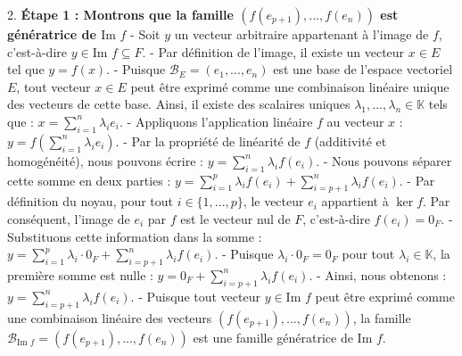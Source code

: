 \documentclass{report}
\begin{document}
2.  \textbf{Étape 1 : Montrons que la famille $(f(e_{p+1}), ..., f(e_n))$ est génératrice de $\text{Im } f$}
    -   Soit $y$ un vecteur arbitraire appartenant à l'image de $f$, c'est-à-dire $y \in \text{Im } f \subseteq F$.
    -   Par définition de l'image, il existe un vecteur $x \in E$ tel que $y = f(x)$.
    -   Puisque $\mathcal{B}_E = (e_1, ..., e_n)$ est une base de l'espace vectoriel $E$, tout vecteur $x \in E$ peut être exprimé comme une combinaison linéaire unique des vecteurs de cette base. Ainsi, il existe des scalaires uniques $\lambda_1, ..., \lambda_n \in \mathbb{K}$ tels que :
        $x = \sum_{i=1}^n \lambda_i e_i$.
    -   Appliquons l'application linéaire $f$ au vecteur $x$ :
        $y = f\left(\sum_{i=1}^n \lambda_i e_i\right)$.
    -   Par la propriété de linéarité de $f$ (additivité et homogénéité), nous pouvons écrire :
        $y = \sum_{i=1}^n \lambda_i f(e_i)$.
    -   Nous pouvons séparer cette somme en deux parties :
        $y = \sum_{i=1}^p \lambda_i f(e_i) + \sum_{i=p+1}^n \lambda_i f(e_i)$.
    -   Par définition du noyau, pour tout $i \in \{1, ..., p\}$, le vecteur $e_i$ appartient à $\ker f$. Par conséquent, l'image de $e_i$ par $f$ est le vecteur nul de $F$, c'est-à-dire $f(e_i) = 0_F$.
    -   Substituons cette information dans la somme :
        $y = \sum_{i=1}^p \lambda_i \cdot 0_F + \sum_{i=p+1}^n \lambda_i f(e_i)$.
    -   Puisque $\lambda_i \cdot 0_F = 0_F$ pour tout $\lambda_i \in \mathbb{K}$, la première somme est nulle :
        $y = 0_F + \sum_{i=p+1}^n \lambda_i f(e_i)$.
    -   Ainsi, nous obtenons :
        $y = \sum_{i=p+1}^n \lambda_i f(e_i)$.
    -   Puisque tout vecteur $y \in \text{Im } f$ peut être exprimé comme une combinaison linéaire des vecteurs $(f(e_{p+1}), ..., f(e_n))$, la famille $\mathcal{B}_{\text{Im } f} = (f(e_{p+1}), ..., f(e_n))$ est une famille génératrice de $\text{Im } f$.
\end{document}
